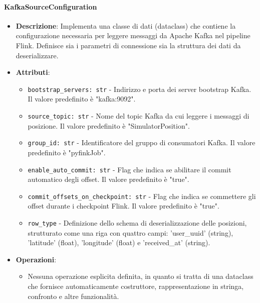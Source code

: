 \documentclass[10pt]{article}
\begin{document}
    \paragraph{KafkaSourceConfiguration}
    \begin{itemize} 
    \item \textbf{Descrizione}: Implementa una classe di dati (dataclass) che contiene la configurazione necessaria per leggere messaggi da Apache Kafka nel pipeline Flink. Definisce sia i parametri di connessione sia la struttura dei dati da deserializzare.
    \item \textbf{Attributi}:
    \begin{itemize}
        \item \texttt{bootstrap\_servers: str} - Indirizzo e porta dei server bootstrap Kafka. Il valore predefinito è "kafka:9092".
        \item \texttt{source\_topic: str} - Nome del topic Kafka da cui leggere i messaggi di posizione. Il valore predefinito è "SimulatorPosition".
        \item \texttt{group\_id: str} - Identificatore del gruppo di consumatori Kafka. Il valore predefinito è "pyfinkJob".
        \item \texttt{enable\_auto\_commit: str} - Flag che indica se abilitare il commit automatico degli offset. Il valore predefinito è "true".
        \item \texttt{commit\_offsets\_on\_checkpoint: str} - Flag che indica se commettere gli offset durante i checkpoint Flink. Il valore predefinito è "true".
        \item \texttt{row\_type} - Definizione dello schema di deserializzazione delle posizioni, strutturato come una riga con quattro campi: 'user\_uuid' (string), 'latitude' (float), 'longitude' (float) e 'received\_at' (string).
    \end{itemize}
    
    \item \textbf{Operazioni}:
    \begin{itemize}
        \item Nessuna operazione esplicita definita, in quanto si tratta di una dataclass che fornisce automaticamente costruttore, rappresentazione in stringa, confronto e altre funzionalità.
    \end{itemize}
    \end{itemize}
    
\end{document}
